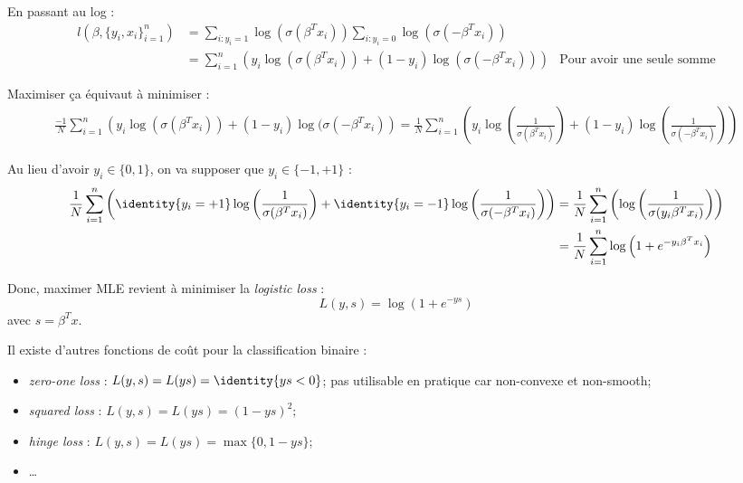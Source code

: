         En passant au log :
        \begin{align*}
            l(\beta, \{y_i, x_i\}_{i=1}^n) &= \sum_{i:y_i=1} \log(\sigma(\beta^T x_i)) \sum_{i:y_i=0} \log(\sigma(-\beta^T x_i))\\
            &= \sum_{i=1}^n \left(y_i \log(\sigma(\beta^T x_i)) + (1 - y_i) \log(\sigma(-\beta^T x_i))\right) & \text{Pour avoir une seule somme}
        \end{align*}

        Maximiser ça équivaut à minimiser :
        \begin{align*}
            \frac{-1}{N} \sum_{i=1}^n \left(y_i \log(\sigma(\beta^T x_i)) + (1 - y_i)\log(\sigma(-\beta^T x_i)\right) = \frac{1}{N}\sum_{i=1}^n\left(y_i \log\left(\frac{1}{\sigma(\beta^T x_i)}\right) + (1 - y_i) \log\left(\frac{1}{\sigma(-\beta^T x_i)}\right)\right)
        \end{align*}

        Au lieu d'avoir \(y_i \in \{0, 1\}\), on va supposer que \(y_i \in \{-1, +1\}\) :
        \begin{align*}
            \frac{1}{N}\sum_{i=1}^n \left(\identity\{y_i = +1\}\log\left(\frac{1}{\sigma(\beta^T x_i)}\right) + \identity\{y_i=-1\} \log\left(\frac{1}{\sigma(-\beta^T x_i)}\right)\right) &= \frac{1}{N} \sum_{i=1}^n \left(\log\left(\frac{1}{\sigma(y_i \beta^T x_i)}\right)\right)\\
            &= \frac{1}{N} \sum_{i=1}^n \log\left(1 + e^{-y_i \beta^T x_i}\right)
        \end{align*}

        Donc, maximer MLE revient à minimiser la \textit{logistic loss} :
        \[
            L(y, s) = \log(1 + e^{-ys})
        \]
        avec \(s = \beta^T x\).

        Il existe d'autres fonctions de coût pour la classification binaire :
        \begin{itemize}
            \item \textit{zero-one loss} : \(L(y, s) = L(ys) = \identity\{ys < 0\}\); pas utilisable en pratique car non-convexe et non-smooth;
            \item \textit{squared loss} : \(L(y, s) = L(ys) = (1 - ys)^2\);
            \item \textit{hinge loss} : \(L(y, s) = L(ys) = \max\{0, 1 - ys\}\);
            \item \dots
        \end{itemize}

